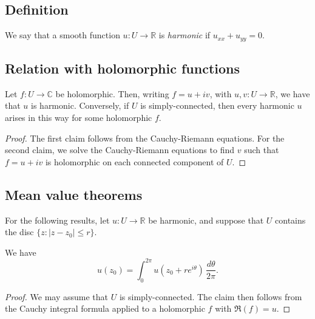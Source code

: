 \documentclass[reqno]{amsart} 
\begin{document}
\subsection{Definition}\label{sec:cj41z467iy}

\begin{definition}\label{definition:cj41z466s8}
We say that a smooth function $u : U \rightarrow \mathbb{R}$ is \emph{harmonic} if $u_{x x} + u_{y y} = 0$.
\end{definition}

\subsection{Relation with holomorphic functions}\label{sec:cj41z46427}

\begin{lemma}
  Let $f : U \rightarrow \mathbb{C}$ be holomorphic.  Then, writing $f = u + i v$, with $u, v : U \rightarrow \mathbb{R}$, we have that $u$ is harmonic.  Conversely, if $U$ is simply-connected, then every harmonic $u$ arises in this way for some holomorphic $f$.
\end{lemma}
\begin{proof}
The first claim follows from the Cauchy-Riemann equations.  For the second claim, we solve the Cauchy-Riemann equations to find $v$ such that $f = u + i v$ is holomorphic on each connected component of $U$.
\end{proof}

\subsection{Mean value theorems}\label{sec:cj41z4625i}
For the following results, let $u : U \rightarrow \mathbb{R}$ be harmonic, and suppose that $U$ contains the disc $\{z : \lvert z - z_0 \rvert \leq r\}$.
\begin{lemma}\label{lemma:cj41z461iw}
  We have
  \begin{equation*}
u(z_0) = \int_{0}^{2 \pi } u (z_0 + r e^{i \theta }) \, \frac{d \theta }{ 2 \pi }.
\end{equation*}
\end{lemma}
\begin{proof}
We may assume that $U$ is simply-connected.  The claim then follows from the Cauchy integral formula applied to a holomorphic $f$ with $\Re(f) = u$.
\end{proof}
\end{document}
